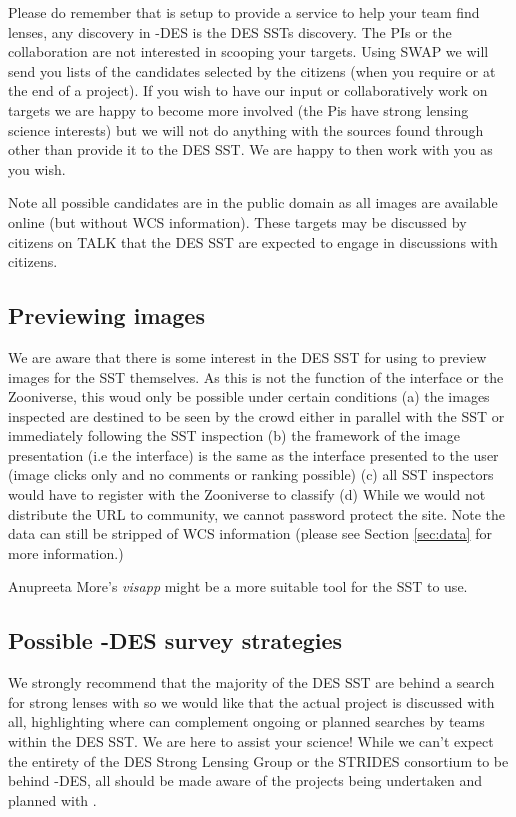 \documentclass[a4paper,twocolumn]{article}
\begin{document}
Please do remember that \sw is setup to provide a service to help your team find lenses, any discovery in \sw-DES is the DES SSTs discovery. The \sw PIs or the \sw collaboration are not interested in scooping your targets. Using SWAP we will send you lists of the candidates selected by the citizens (when you require or at the end of a project). If you wish to have our input or collaboratively work on targets we are happy to become more involved (the \sw Pis have strong lensing science interests) but we will not do anything with the sources found through \sw other than provide it to the DES SST.  We are happy to then work with you as you wish. 

Note all possible candidates are in the public domain as all images are available online (but without WCS information). These targets may be discussed by citizens on \sw TALK that the DES SST are expected to engage in discussions with citizens.

\subsection{Previewing images}
We are aware that there is some interest in the DES SST for using \sw to preview images for the SST themselves. As this is not the function of the \sw interface or the Zooniverse, this woud only be possible under certain conditions
(a) the images inspected are destined to be seen by the crowd either in parallel with the SST or immediately following the SST inspection
(b) the framework of the image presentation (i.e the \sw interface) is the same as the interface presented to the user (image clicks only and no comments or ranking possible)
(c) all SST inspectors would have to register with the Zooniverse to classify
(d) While we would not distribute the URL to community, we cannot password protect the site. Note the data can still be stripped of WCS information (please see Section \ref{sec:data} for more information.)

Anupreeta More's \textit{visapp} might be a more suitable tool for the SST to use.


\subsection{Possible \sw-DES survey strategies}

We strongly recommend that the majority of the DES SST are behind a search for strong lenses with \sw so we would like that the actual \sw project is discussed with all, highlighting where \sw can complement ongoing or planned searches by teams within the DES SST. We are here to assist your science! While we can't expect the entirety of the DES Strong Lensing Group or the STRIDES consortium to be behind \sw-DES, all should be made aware of the projects being undertaken and planned with \sw.
\end{document}
